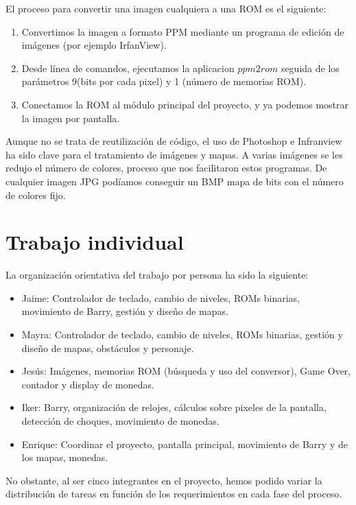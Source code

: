 \documentclass[11pt, a4paper, spanish, openright, twoside]{book}
\begin{document}
El proceso para convertir una imagen cualquiera a una ROM es el siguiente:
\begin{enumerate}
\item Convertimos la imagen a formato PPM mediante un programa de edición de imágenes (por ejemplo IrfanView).
\item Desde línea de comandos, ejecutamos la aplicacion $ppm2rom$ seguida de los parámetros 9(bits por cada pixel) y 1 (número de memorias ROM).
\item Conectamos la ROM al módulo principal del proyecto, y ya podemos mostrar la imagen por pantalla.
\end{enumerate}

Aunque no se trata de reutilización de código, el uso de Photoshop  e Infranview ha sido clave para el tratamiento de imágenes y mapas. A varias imágenes se les redujo el número de colores, proceso que nos facilitaron estos programas. De cualquier imagen JPG podíamos conseguir un BMP mapa de bits con el número de colores fijo.




\section{Trabajo individual}
La organización orientativa del trabajo por persona ha sido la siguiente:
\begin{itemize}
\item Jaime: Controlador de teclado, cambio de niveles, ROMs binarias, movimiento de Barry, gestión y diseño de mapas.
\item Mayra: Controlador de teclado,  cambio de niveles, ROMs binarias, gestión y diseño de mapas, obstáculos y personaje.
\item Jesús: Imágenes, memorias ROM (búsqueda y uso del conversor), Game Over, contador y display de monedas.
\item Iker: Barry, organización de relojes, cálculos sobre pixeles de la pantalla, detección de choques, movimiento de monedas.
\item Enrique: Coordinar el proyecto, pantalla principal, movimiento de Barry y de los mapas, monedas.
\end{itemize}
No obstante, al ser cinco integrantes en el proyecto, hemos podido variar la distribución de tareas en función de los requerimientos en cada fase del proceso. 
\end{document}
